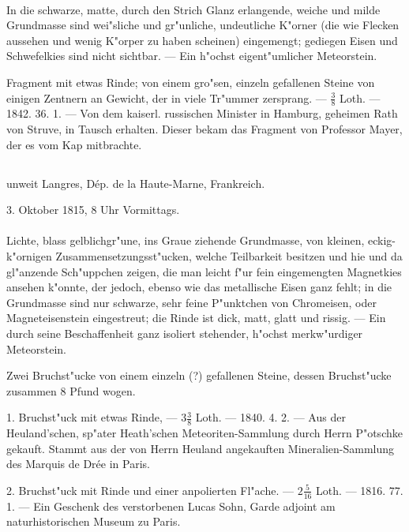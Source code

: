 \documentclass[a4paper, 11pt, oneside, polutonikogreek, german]{article}
\begin{document}
\paragraph{}
In die schwarze, matte, durch den Strich Glanz erlangende, weiche und milde Grundmasse sind wei"sliche und gr"unliche, undeutliche K"orner (die wie Flecken aussehen und wenig K"orper zu haben scheinen) eingemengt; gediegen Eisen und Schwefelkies sind nicht sichtbar. --- Ein h"ochst eigent"umlicher Meteorstein.

Fragment mit etwas Rinde; von einem gro"sen, einzeln gefallenen Steine von einigen Zentnern an Gewicht, der in viele Tr"ummer zersprang. --- $\frac{3}{8}$ Loth. --- 1842. 36. 1. --- Von dem kaiserl. russischen Minister in Hamburg, geheimen Rath von Struve, in Tausch erhalten. Dieser bekam das Fragment von Professor Mayer, der es vom Kap mitbrachte.
\subsection[\frakfamily{Chassigny.}]{}
\begin{center}
unweit Langres, Dép. de la Haute-Marne, Frankreich.

3. Oktober 1815, 8 Uhr Vormittags.
\end{center}
\paragraph{}
Lichte, blass gelblichgr"une, ins Graue ziehende Grundmasse, von kleinen, eckig-k"ornigen Zusammensetzungsst"ucken, welche Teilbarkeit besitzen und hie und da gl"anzende Sch"uppchen zeigen, die man leicht f"ur fein eingemengten Magnetkies ansehen k"onnte, der jedoch, ebenso wie das metallische Eisen ganz fehlt; in die Grundmasse sind nur schwarze, sehr feine P"unktchen von Chromeisen, oder Magneteisenstein eingestreut; die Rinde ist dick, matt, glatt und rissig. --- Ein durch seine Beschaffenheit ganz isoliert stehender, h"ochst merkw"urdiger Meteorstein.

Zwei Bruchst"ucke von einem einzeln (?) gefallenen Steine, dessen Bruchst"ucke zusammen 8 Pfund wogen.

1. Bruchst"uck mit etwas Rinde, --- $3\frac{3}{8}$ Loth. --- 1840. 4. 2. --- Aus der Heuland’schen, sp"ater Heath’schen Meteoriten-Sammlung durch Herrn P"otschke gekauft. Stammt aus der von Herrn Heuland angekauften Mineralien-Sammlung des Marquis de Drée in Paris.

2. Bruchst"uck mit Rinde und einer anpolierten Fl"ache. --- $2\frac{5}{16}$ Loth. --- 1816. 77. 1. --- Ein Geschenk des verstorbenen Lucas Sohn, Garde adjoint am naturhistorischen Museum zu Paris.
\end{document}
